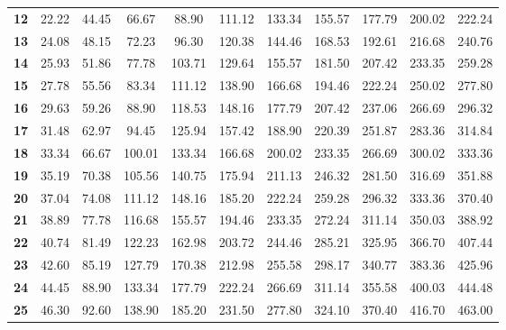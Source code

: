 \documentclass{article}
\begin{document}
\begin{table}[h]
\begin{tabular}{c|cccccccccc}
\textbf{12}      & 22.22      & 44.45      & 66.67      & 88.90      & 111.12     & 133.34     & 155.57     & 177.79     & 200.02     & 222.24      \\
\textbf{13}      & 24.08      & 48.15      & 72.23      & 96.30      & 120.38     & 144.46     & 168.53     & 192.61     & 216.68     & 240.76      \\
\textbf{14}      & 25.93      & 51.86      & 77.78      & 103.71     & 129.64     & 155.57     & 181.50     & 207.42     & 233.35     & 259.28      \\
\textbf{15}      & 27.78      & 55.56      & 83.34      & 111.12     & 138.90     & 166.68     & 194.46     & 222.24     & 250.02     & 277.80      \\
\textbf{16}      & 29.63      & 59.26      & 88.90      & 118.53     & 148.16     & 177.79     & 207.42     & 237.06     & 266.69     & 296.32      \\
\textbf{17}      & 31.48      & 62.97      & 94.45      & 125.94     & 157.42     & 188.90     & 220.39     & 251.87     & 283.36     & 314.84      \\
\textbf{18}      & 33.34      & 66.67      & 100.01     & 133.34     & 166.68     & 200.02     & 233.35     & 266.69     & 300.02     & 333.36      \\
\textbf{19}      & 35.19      & 70.38      & 105.56     & 140.75     & 175.94     & 211.13     & 246.32     & 281.50     & 316.69     & 351.88      \\
\textbf{20}      & 37.04      & 74.08      & 111.12     & 148.16     & 185.20     & 222.24     & 259.28     & 296.32     & 333.36     & 370.40      \\
\textbf{21}      & 38.89      & 77.78      & 116.68     & 155.57     & 194.46     & 233.35     & 272.24     & 311.14     & 350.03     & 388.92      \\
\textbf{22}      & 40.74      & 81.49      & 122.23     & 162.98     & 203.72     & 244.46     & 285.21     & 325.95     & 366.70     & 407.44      \\
\textbf{23}      & 42.60      & 85.19      & 127.79     & 170.38     & 212.98     & 255.58     & 298.17     & 340.77     & 383.36     & 425.96      \\
\textbf{24}      & 44.45      & 88.90      & 133.34     & 177.79     & 222.24     & 266.69     & 311.14     & 355.58     & 400.03     & 444.48      \\
\textbf{25}      & 46.30      & 92.60      & 138.90     & 185.20     & 231.50     & 277.80     & 324.10     & 370.40     & 416.70     & 463.00      \\

\end{tabular}
\end{table}
\end{document}
